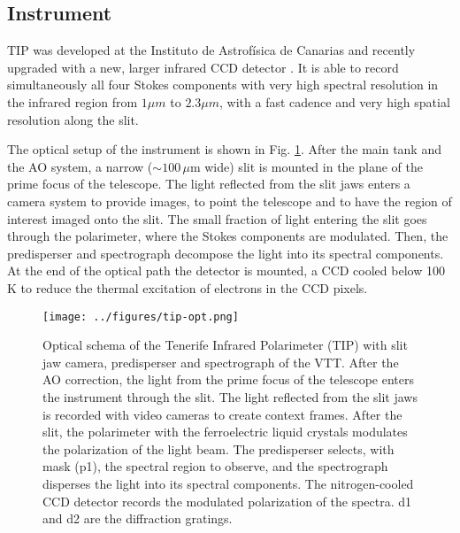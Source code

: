 \subsection{Instrument\label{inst:tip}}
TIP was developed at the Instituto de Astrof\'isica de Canarias  \citep{Martinez-Pillet:1999lr} and recently upgraded with a new, larger infrared CCD detector \citep{Collados:2007fk}. It is able to record simultaneously all four Stokes components with very high spectral resolution in the infrared region from $1 \mu m $ to $2.3 \mu m$, with a fast cadence and very high spatial resolution along the slit.

The optical setup of the instrument is shown in Fig. \ref{fig:tip:optical}. After the main tank and the AO system, a narrow ($\sim100 \,\mu$m wide) slit is mounted in the plane of the prime focus of the telescope. The light reflected from the slit jaws enters a camera system to provide images, to point the telescope and to have the region of interest imaged onto the slit. The small fraction of light entering the slit goes through  the polarimeter, where the Stokes components are modulated. Then, the predisperser and spectrograph  decompose the light into its spectral components. At the end of the optical path the detector is mounted, a CCD cooled below 100 K
 to reduce the thermal excitation of electrons in the CCD pixels.
 
\begin{figure}[t]
\begin{center}
\texttt{[image: ../figures/tip-opt.png]}
\caption{Optical schema of the Tenerife Infrared Polarimeter (TIP) with slit jaw camera, predisperser and spectrograph of the VTT. After the AO correction, the light from the prime focus of the telescope enters the instrument through the slit. The light reflected from the slit jaws is recorded with video cameras to create context frames.  After the slit, the polarimeter with the ferroelectric liquid crystals modulates the polarization of the light beam. The predisperser selects, with mask (p1), the spectral region to observe, and the spectrograph disperses the light into its spectral components. The nitrogen-cooled CCD detector records the modulated polarization of the spectra. d1 and d2 are the diffraction gratings.}
\label{fig:tip:optical}
\end{center}
\end{figure}

